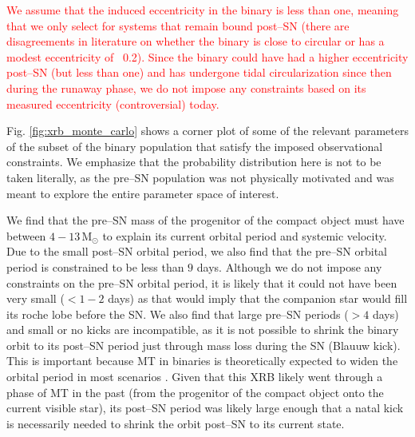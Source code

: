 \documentclass[linenumbers,trackchanges,twocolumn]{aastex701}
\newcommand{\Mdot}{\mathrm{M}_{\odot}}
\newcommand{\red}{\textcolor{red}}
\begin{document}
\red{We assume that the induced eccentricity in the binary is less than one, meaning that we only select for systems that remain bound post--SN (there are disagreements in literature on whether the binary is close to circular or has a modest eccentricity of ~0.2). Since the binary could have had a higher eccentricity post--SN (but less than one) and has undergone tidal circularization since then during the runaway phase, we do not impose any constraints based on its measured eccentricity (controversial) today.}

Fig. \ref{fig:xrb_monte_carlo} shows a corner plot of some of the relevant parameters of the subset of the binary population that satisfy the imposed observational constraints. We emphasize that the probability distribution here is not to be taken literally, as the pre--SN population was not physically motivated and was meant to explore the entire parameter space of interest.

We find that the pre--SN mass of the progenitor of the compact object must have between $4-13\,\Mdot$ to explain its current orbital period and systemic velocity. Due to the small post--SN orbital period, we also find that the pre--SN orbital period is constrained to be less than $9$ days. Although we do not impose any constraints on the pre--SN orbital period, it is likely that it could not have been very small ($<1-2$ days) as that would imply that the companion star would fill its roche lobe before the SN. We also find that large pre--SN periods ($>4$ days) and small or no kicks are incompatible, as it is not possible to shrink the binary orbit to its post--SN period just through mass loss during the SN (Blauuw kick). This is important because MT in binaries is theoretically expected to widen the orbital period in most scenarios \cite{2019A&A...624A..66R}. Given that this XRB likely went through a phase of MT in the past (from the progenitor of the compact object onto the current visible star), its post--SN period was likely large enough that a natal kick is necessarily needed to shrink the orbit post--SN to its current state. 
\end{document}

